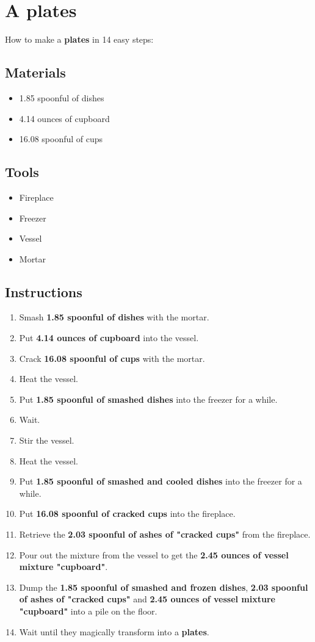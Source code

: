 \documentclass{article}
\begin{document}
\section{A plates}How to make a \textbf{plates} in 14 easy steps:

\subsection{Materials}\begin{itemize}
\item 
1.85 spoonful of dishes
\item 
4.14 ounces of cupboard
\item 
16.08 spoonful of cups
\end{itemize}
\subsection{Tools}\begin{itemize}
\item 
Fireplace
\item 
Freezer
\item 
Vessel
\item 
Mortar
\end{itemize}
\subsection{Instructions}\begin{enumerate}
\item 
Smash \textbf{1.85 spoonful of dishes} with the mortar.
\item 
Put \textbf{4.14 ounces of cupboard} into the vessel.
\item 
Crack \textbf{16.08 spoonful of cups} with the mortar.
\item 
Heat the vessel.
\item 
Put \textbf{1.85 spoonful of smashed dishes} into the freezer for a while.
\item 
Wait.
\item 
Stir the vessel.
\item 
Heat the vessel.
\item 
Put \textbf{1.85 spoonful of smashed and cooled dishes} into the freezer for a while.
\item 
Put \textbf{16.08 spoonful of cracked cups} into the fireplace.
\item 
Retrieve the \textbf{2.03 spoonful of ashes of "cracked cups"} from the fireplace.
\item 
Pour out the mixture from the vessel to get the \textbf{2.45 ounces of vessel mixture "cupboard"}.
\item 
Dump the \textbf{1.85 spoonful of smashed and frozen dishes}, \textbf{2.03 spoonful of ashes of "cracked cups"} and \textbf{2.45 ounces of vessel mixture "cupboard"} into a pile on the floor.
\item 
Wait until they magically transform into a \textbf{plates}.
\end{enumerate}
\newpage
\end{document}
